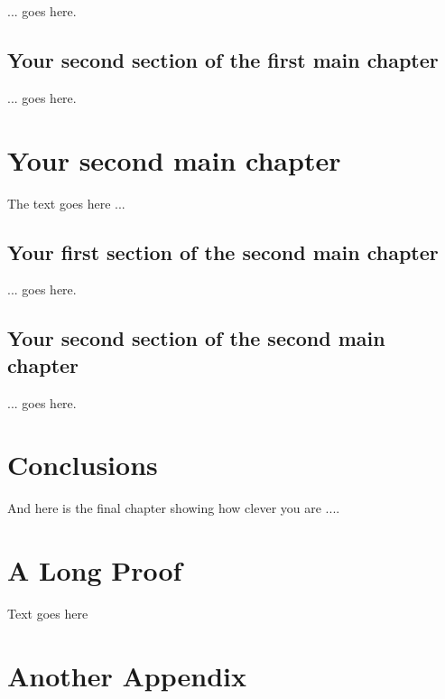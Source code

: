 \documentclass[12pt, a4paper,twoside]{report}
\theoremstyle{plain} %
\theoremstyle{definition} %
\theoremstyle{remark} %
\numberwithin{equation}{chapter}
\begin{document}
... goes here.

\section{Your second section of the first main chapter}\label{sec:2.2}

... goes here.

\chapter{Your second main chapter}\label{ch:3}

The text goes here ... 

\section{Your first section of the second main chapter}\label{sec:3.1}

... goes here.

\section{Your second section of the second main chapter}\label{sec:3.2}

... goes here.

\chapter{Conclusions}\label{ch:concl}
And here is the final chapter showing how clever you are ....




\appendix
\chapter{A Long Proof}

Text goes here


\chapter{Another Appendix}
\end{document}
